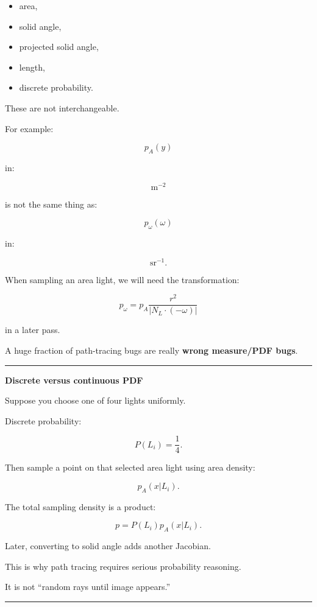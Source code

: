 \begin{itemize}
\tightlist
\item
  area,
\item
  solid angle,
\item
  projected solid angle,
\item
  length,
\item
  discrete probability.
\end{itemize}

These are not interchangeable.

For example:

\[
p_A(y)
\]

in:

\[
\mathrm{m}^{-2}
\]

is not the same thing as:

\[
p_\omega(\omega)
\]

in:

\[
\mathrm{sr}^{-1}.
\]

When sampling an area light, we will need the transformation:

\[
\boxed{
p_\omega
=
p_A
\frac{r^2}
{|N_L\cdot(-\omega)|}
}
\]

in a later pass.

A huge fraction of path-tracing bugs are really \textbf{wrong measure/PDF bugs}.

\begin{center}\rule{0.5\linewidth}{0.5pt}\end{center}

\textbf{Discrete versus continuous PDF}

Suppose you choose one of four lights uniformly.

Discrete probability:

\[
P(L_i)=\frac14.
\]

Then sample a point on that selected area light using area density:

\[
p_A(x|L_i).
\]

The total sampling density is a product:

\[
\boxed{
p=
P(L_i)
p_A(x|L_i).
}
\]

Later, converting to solid angle adds another Jacobian.

This is why path tracing requires serious probability reasoning.

It is not ``random rays until image appears.''

\begin{center}\rule{0.5\linewidth}{0.5pt}\end{center}

